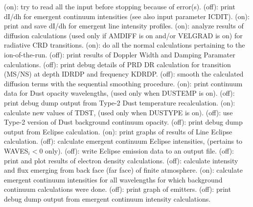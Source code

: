 \space \vbox { (on): \bang
try to read all the input before stopping because of error(s).}
\space \vbox { (off): \bang
print dI/dh for emergent continuum intensities (see also input parameter 
\break ICDIT).}
\space \vbox { (on): \bang
print and save dI/dh for emergent line intensity profiles.}
\space \vbox { (on): \bang
analyze results of diffusion calculations (used only if AMDIFF is on and/or
VELGRAD is on) for radiative CRD transitions.}
\space \vbox { (on): \bang
do all the normal calculations pertaining to the ion-of-the-run.}
\space \vbox { (off): \bang
print results of Doppler Width and Damping Paramater calculations.}
\space \vbox { (off): \bang
print debug details of PRD DR calculation for transition (MS/NS) at depth
IDRDP and frequency KDRDP.}
\space \vbox { (off): \bang
smooth the calculated diffusion terms with the sequential
smoothing procedure.}
\space \vbox { (on): \bang
print continuum data for Dust opacity wavelengths, (used only when 
\break DUSTEMP is on).}
\space \vbox { (off): \bang
print debug dump output from Type-2 Dust temperature recalculation.}
\space \vbox { (on): \bang
calculate new values of TDST, (used only when DUSTYPE is on).}
\space \vbox { (off): \bang
use Type-2 version of Dust background continuum opacity.}
\space \vbox { (off): \bang
print debug dump output from Eclipse calculation.}
\space \vbox { (on): \bang
print graphs of results of Line Eclipse calculation.}
\space \vbox { (off): \bang
calculate emergent continuum Eclipse intensities, (pertains to
WAVES$_i < 0$ only).}
\space \vbox { (off): \bang
write Eclipse emission data to an output file.}
\space \vbox { (off): \bang
print and plot results of electron density calculations.}
\space \vbox { (off): \bang
calculate intensity and flux emerging from back face (far face) of finite 
atmosphere.}
\space \vbox { (on): \bang
calculate emergent continuum intensities for all wavelengths for which
background continuum calculations were done.}
\space \vbox { (off): \bang
print graph of emitters.}
\space \vbox { (off): \bang
print debug dump output from emergent continuum intensity calculations.}
